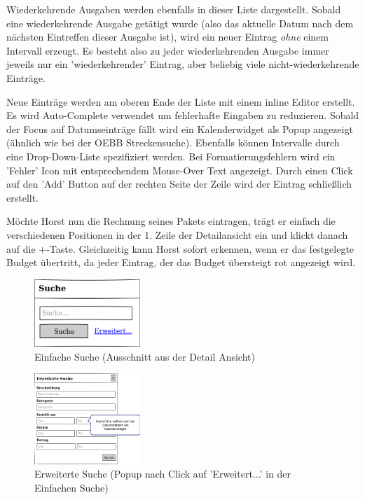 Wiederkehrende Ausgaben werden ebenfalls in dieser Liste dargestellt. Sobald eine wiederkehrende Ausgabe getätigt wurde
(also das aktuelle Datum nach dem nächsten Eintreffen dieser Ausgabe ist), wird ein neuer Eintrag \emph{ohne} einem Intervall
erzeugt. Es besteht also zu jeder wiederkehrenden Ausgabe immer jeweils nur ein 'wiederkehrender' Eintrag, aber beliebig viele
nicht-wiederkehrende Einträge.

Neue Einträge werden am oberen Ende der Liste mit einem inline Editor erstellt. Es wird Auto-Complete verwendet um fehlerhafte
Eingaben zu reduzieren. Sobald der Focus auf Datumseinträge fällt wird ein Kalenderwidget als Popup angezeigt (ähnlich wie bei der
OEBB Streckensuche). Ebenfalls können Intervalle durch eine Drop-Down-Liste spezifiziert werden. Bei Formatierungsfehlern wird ein 'Fehler' Icon mit entsprechendem Mouse-Over Text angezeigt. Durch einen Click
auf den 'Add' Button auf der rechten Seite der Zeile wird der Eintrag
schließlich erstellt.

M\"ochte Horst nun die Rechnung seines Pakets eintragen, trägt er einfach die
verschiedenen Positionen in der 1. Zeile der Detailansicht ein und klickt danach
auf die \glqq +\grqq-Taste. Gleichzeitig kann Horst sofort erkennen, wenn er das
festgelegte Budget \"ubertritt, da jeder Eintrag, der das Budget übersteigt
rot angezeigt wird.

\begin{figure}[htl]
\centering
\includegraphics[width=4cm]{img/web_simple_search}
\caption{Einfache Suche (Ausschnitt aus der Detail Ansicht)}
\label{fig:web_simple_search}
\end{figure}

\begin{figure}[htl]
\centering
\includegraphics[width=4cm]{img/web_advanced_search}
\caption{Erweiterte Suche (Popup nach Click auf 'Erweitert...' in der Einfachen Suche)}
\label{fig:web_advanced_search}
\end{figure}


